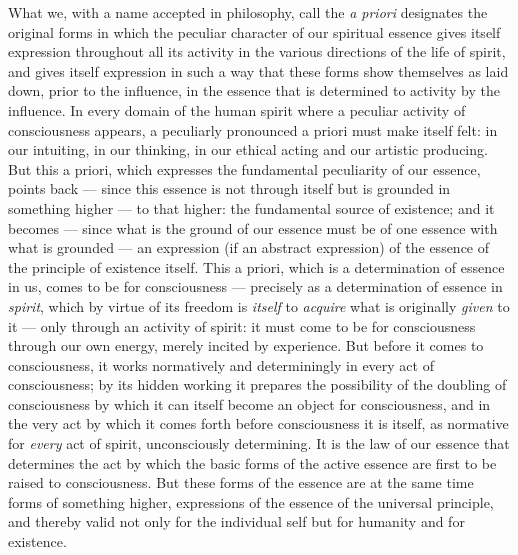 \documentclass[12pt,a4paper,openany]{book}
\newcommand{\opage}[1]{\marginnote{\footnotesize\textit{[#1]}}}
\begin{document}
What we, with a name accepted in philosophy, call the \emph{a priori}
designates the original forms in which the peculiar character of our
spiritual essence gives itself expression throughout all its activity
in the various directions of the life of spirit, and gives itself
expression in such a way that these forms show themselves as laid down,
prior to the influence, in the essence that is determined to activity
by the influence. In every domain of the human spirit where a peculiar
activity of consciousness appears, a peculiarly pronounced a priori
\opage{53}must make itself felt: in our intuiting, in our thinking, in
our ethical acting and our artistic producing. But this a priori,
which expresses the fundamental peculiarity of our essence, points
back --- since this essence is not through itself but is grounded in
something higher --- to that higher: the fundamental source of
existence; and it becomes --- since what is the ground of our essence
must be of one essence with what is grounded --- an expression (if an
abstract expression) of the essence of the principle of existence
itself. This a priori, which is a determination of essence in us,
comes to be for consciousness --- precisely as a determination of
essence in \emph{spirit}, which by virtue of its freedom is
\emph{itself} to \emph{acquire} what is originally \emph{given} to it
--- only through an activity of spirit: it must come to be for
consciousness through our own energy, merely incited by experience.
But before it comes to consciousness, it works normatively and
determiningly in every act of consciousness; by its hidden working it
prepares the possibility of the doubling of consciousness by which it
can itself become an object for consciousness, and in the very act by
which it comes forth before consciousness it is itself, as normative
for \emph{every} act of spirit, unconsciously determining. It is the
law of our essence that determines the act by which the basic forms of
the active essence are first to be raised to consciousness. But these
forms of the essence are at the same time forms of something higher,
expressions of the essence of the universal principle, and thereby
valid not only for the individual self but for humanity and for
existence.
\end{document}
